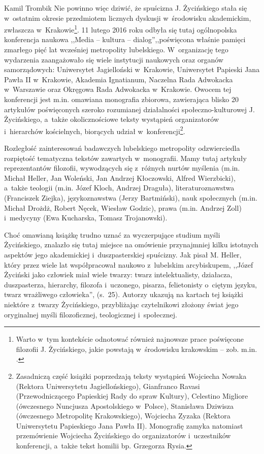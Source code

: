 \begin{recplenv}{Kamil Trombik}
Nie powinno więc dziwić, że spuścizna J. Życińskiego stała się w~ostatnim okresie przedmiotem licznych dyskusji w~środowisku akademickim, zwłaszcza w~Krakowie\footnote{Warto w~tym kontekście odnotować również najnowsze prace poświęcone filozofii J. Życińskiego, jakie powstają w~środowisku krakowskim -- zob. m.in.
\parencites[][]{liana_nauka_2019}[][]{liana_2020}.%
}. 11 lutego 2016 roku odbyła się tutaj ogólnopolska konferencja naukowa ,,Media -- kultura -- dialog'',,poświęcona właśnie pamięci zmarłego pięć lat wcześniej metropolity lubelskiego. W~organizację tego wydarzenia zaangażowało się wiele instytucji naukowych oraz organów samorządowych: Uniwersytet Jagielloński w~Krakowie, Uniwersytet Papieski Jana Pawła II w~Krakowie, Akademia Ignatianum, Naczelna Rada Adwokacka w~Warszawie oraz Okręgowa Rada Adwokacka w~Krakowie. Owocem tej konferencji jest m.in. omawiana monografia zbiorowa, zawierająca blisko 20 artykułów poświęconych szeroko rozumianej działalności społeczno-kulturowej J. Życińskiego, a~także okolicznościowe teksty wystąpień organizatorów i~hierarchów kościelnych, biorących udział w~konferencji\footnote{Zasadniczą część książki poprzedzają teksty wystąpień Wojciecha Nowaka (Rektora Uniwersytetu Jagiellońskiego), Gianfranco Ravasi (Przewodniczącego Papieskiej Rady do spraw Kultury), Celestino Migliore (ówczesnego Nuncjusza Apostolskiego w~Polsce), Stanisława Dziwisza (ówczesnego Metropolitę Krakowskiego), Wojciecha Zyzaka (Rektora Uniwersytetu Papieskiego Jana Pawła II). Monografię zamyka natomiast przemówienie Wojciecha Życińskiego do organizatorów i~uczestników konferencji, a~także tekst homilii bp. Grzegorza Rysia.}.

\enlargethispage{-.5\baselineskip}
Rozległość zainteresowań badawczych lubelskiego metropolity odzwierciedla rozpiętość tematyczna tekstów zawartych w~monografii. Mamy tutaj artykuły reprezentantów filozofii, wywodzących się z~różnych nurtów myślenia (m.in. Michał Heller, Jan Woleński, Jan Andrzej Kłoczowski, Alfred Wierzbicki), a~także teologii (m.in. Józef Kloch, Andrzej Draguła), literaturoznawstwa (Franciszek Ziejka), językoznawstwa (Jerzy Bartmiński), nauk społecznych (m.in. Michał Drożdż, Robert Nęcek, Wiesław Godzic), prawa (m.in. Andrzej Zoll) i~medycyny (Ewa Kucharska, Tomasz Trojanowski).

Choć omawianą książkę trudno uznać za wyczerpujące studium myśli Życińskiego, znalazło się tutaj miejsce na omówienie przynajmniej kilku istotnych aspektów jego akademickiej i~duszpasterskiej spuścizny. Jak pisał M. Heller, który przez wiele lat współpracował naukowo z~lubelskim arcybiskupem, ,,Józef Życiński jako człowiek miał wiele twarzy: twarz intelektualisty, działacza, duszpasterza, hierarchy, filozofa i~uczonego, pisarza, felietonisty o~ciętym języku, twarz wrażliwego człowieka'', (s.~25). Autorzy ukazują na kartach tej książki niektóre z~twarzy Życińskiego, przybliżając czytelnikowi złożony świat jego oryginalnej myśli filozoficznej, teologicznej i~społecznej.


\end{recplenv}
